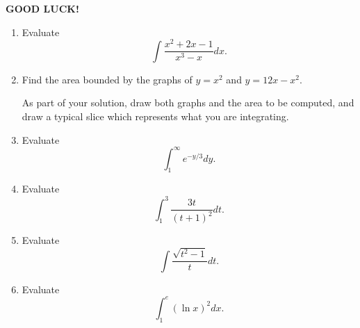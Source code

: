 \documentclass[14pt]{article}
\begin{document}
\begin{center}
{\bf GOOD LUCK!}
\end{center}
\newpage

\begin{enumerate}[(1)]
\item
Evaluate
\[
\int \frac{x^2 + 2x - 1}{x^3 - x} dx.
\]
\item
Find the area bounded by the graphs of $y = x^2$ and $y = 12x - x^2$.

As part of your solution, draw both graphs and the area to be computed, and draw a typical
slice which represents what you are integrating. 
\item
Evaluate
\[
\int_1^{\infty} e^{-y/3} dy.
\]
\item
Evaluate
\[
\int_1^3 \frac{3t}{(t + 1)^2} dt.
\]
\item
Evaluate
\[
\int \frac{ \sqrt{t^2 - 1} }{t} dt.
\]
\item
Evaluate
\[
\int_1^e (\ln x)^2 dx.
\]

\end{enumerate}
\end{document}
